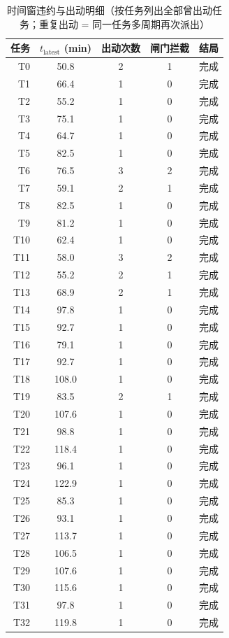 \documentclass[a4paper,11pt]{article}
\begin{document}
\begin{table}[htbp]\centering
\caption{时间窗违约与出动明细（按任务列出全部曾出动任务；重复出动 = 同一任务多周期再次派出）}
\label{tab:exp01-tw}
\begin{tabular}{rcccl}
\toprule
任务 & $t_{\mathrm{latest}}$ (min) & 出动次数 & 闸门拦截 & 结局 \\
\midrule
T0 & 50.8 & 2 & 1 & 完成 \\
T1 & 66.4 & 1 & 0 & 完成 \\
T2 & 55.2 & 1 & 0 & 完成 \\
T3 & 75.1 & 1 & 0 & 完成 \\
T4 & 64.7 & 1 & 0 & 完成 \\
T5 & 82.5 & 1 & 0 & 完成 \\
T6 & 76.5 & 3 & 2 & 完成 \\
T7 & 59.1 & 2 & 1 & 完成 \\
T8 & 82.5 & 1 & 0 & 完成 \\
T9 & 81.2 & 1 & 0 & 完成 \\
T10 & 62.4 & 1 & 0 & 完成 \\
T11 & 58.0 & 3 & 2 & 完成 \\
T12 & 55.2 & 2 & 1 & 完成 \\
T13 & 68.9 & 2 & 1 & 完成 \\
T14 & 97.8 & 1 & 0 & 完成 \\
T15 & 92.7 & 1 & 0 & 完成 \\
T16 & 79.1 & 1 & 0 & 完成 \\
T17 & 92.7 & 1 & 0 & 完成 \\
T18 & 108.0 & 1 & 0 & 完成 \\
T19 & 83.5 & 2 & 1 & 完成 \\
T20 & 107.6 & 1 & 0 & 完成 \\
T21 & 98.8 & 1 & 0 & 完成 \\
T22 & 118.4 & 1 & 0 & 完成 \\
T23 & 96.1 & 1 & 0 & 完成 \\
T24 & 122.9 & 1 & 0 & 完成 \\
T25 & 85.3 & 1 & 0 & 完成 \\
T26 & 93.1 & 1 & 0 & 完成 \\
T27 & 113.7 & 1 & 0 & 完成 \\
T28 & 106.5 & 1 & 0 & 完成 \\
T29 & 107.6 & 1 & 0 & 完成 \\
T30 & 115.6 & 1 & 0 & 完成 \\
T31 & 97.8 & 1 & 0 & 完成 \\
T32 & 119.8 & 1 & 0 & 完成 \\

\end{tabular}
\end{table}
\end{document}
